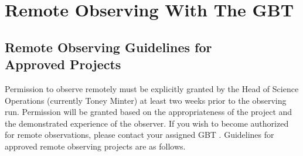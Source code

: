 \chapter{Remote Observing With The GBT}\label{chap:remote}

\section[Remote Observing Guidelines for Approved Projects]
{Remote Observing Guidelines for\\Approved Projects}

Permission to observe remotely must be explicitly granted by the Head of Science
Operations (currently Toney Minter) at least two weeks prior to the observing run.
Permission will be granted based on the appropriateness of the project and the
demonstrated experience of the observer.  If you wish to become authorized for remote
observations, please contact your assigned \gls{GBT} . Guidelines for
approved remote observing projects are as follows.

